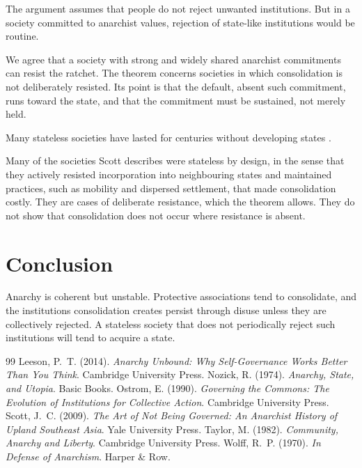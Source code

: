 \documentclass{situationist-preprint}
\begin{document}
\begin{objection}
The argument assumes that people do not reject unwanted institutions. But in a society committed to anarchist values, rejection of state-like institutions would be routine.
\end{objection}

\begin{reply}
We agree that a society with strong and widely shared anarchist commitments can resist the ratchet. The theorem concerns societies in which consolidation is not deliberately resisted. Its point is that the default, absent such commitment, runs toward the state, and that the commitment must be sustained, not merely held.
\end{reply}

\begin{objection}
Many stateless societies have lasted for centuries without developing states \citep{Scott2009}.
\end{objection}

\begin{reply}
Many of the societies Scott describes were stateless by design, in the sense that they actively resisted incorporation into neighbouring states and maintained practices, such as mobility and dispersed settlement, that made consolidation costly. They are cases of deliberate resistance, which the theorem allows. They do not show that consolidation does not occur where resistance is absent.
\end{reply}

\section{Conclusion}

Anarchy is coherent but unstable. Protective associations tend to consolidate, and the institutions consolidation creates persist through disuse unless they are collectively rejected. A stateless society that does not periodically reject such institutions will tend to acquire a state.

\begin{thebibliography}{99}\small
{} Leeson, P.~T. (2014). \emph{Anarchy Unbound: Why Self-Governance Works Better Than You Think}. Cambridge University Press.
 Nozick, R. (1974). \emph{Anarchy, State, and Utopia}. Basic Books.
 Ostrom, E. (1990). \emph{Governing the Commons: The Evolution of Institutions for Collective Action}. Cambridge University Press.
 Scott, J.~C. (2009). \emph{The Art of Not Being Governed: An Anarchist History of Upland Southeast Asia}. Yale University Press.
 Taylor, M. (1982). \emph{Community, Anarchy and Liberty}. Cambridge University Press.
 Wolff, R.~P. (1970). \emph{In Defense of Anarchism}. Harper \& Row.
\end{thebibliography}
\end{document}
